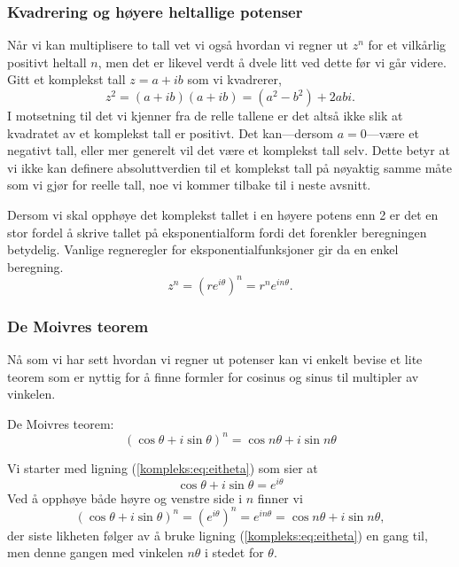 \documentclass[a4paper,norsk,12pt]{article}
\begin{document}
\subsubsection{Kvadrering og høyere heltallige potenser}
Når vi kan multiplisere to tall vet vi også hvordan vi regner ut $z^n$ for et vilkårlig positivt heltall $n$, men det er likevel verdt å dvele litt ved dette før vi går videre. Gitt et komplekst tall $z=a+ib$ som vi kvadrerer,
\begin{displaymath}
	z^2 = (a+ib)(a+ib) = (a^2-b^2) +2abi.
\end{displaymath}
I motsetning til det vi kjenner fra de relle tallene er det altså ikke slik at kvadratet av et komplekst tall er positivt. Det kan---dersom $a=0$---være et negativt tall, eller mer generelt vil det være et komplekst tall selv. Dette betyr at vi ikke kan definere absoluttverdien til et komplekst tall på nøyaktig samme måte som vi gjør for reelle tall, noe vi kommer tilbake til i neste avsnitt. 

Dersom vi skal opphøye det komplekst tallet i en høyere potens enn 2 er det en stor fordel å skrive tallet på eksponentialform fordi det forenkler beregningen betydelig. Vanlige regneregler for eksponentialfunksjoner gir da en enkel beregning.
\begin{displaymath}
	z^n = \left(re^{i\theta}\right)^n = r^n e^{in\theta}.
\end{displaymath}

\subsubsection{De Moivres teorem}
Nå som vi har sett hvordan vi regner ut potenser kan vi enkelt bevise et lite teorem som er nyttig for å finne formler for cosinus og sinus til multipler av vinkelen.
\begin{ttheorem}
De Moivres teorem: 
\begin{displaymath}
	\left(\cos\theta + i\sin\theta\right)^n = \cos n\theta + i\sin n\theta
\end{displaymath}
\end{ttheorem}
\begin{tproof}
Vi starter med ligning (\ref{kompleks:eq:eitheta}) som sier at
\begin{displaymath}
	\cos\theta + i\sin\theta = e^{i\theta}
\end{displaymath}
Ved å opphøye både høyre og venstre side i $n$ finner vi
\begin{displaymath}
	\left(\cos\theta+ i\sin\theta\right)^n = \left(e^{i\theta}\right)^n = e^{in\theta} = \cos n\theta + i\sin n\theta,
\end{displaymath}
der siste likheten følger av å bruke ligning (\ref{kompleks:eq:eitheta}) en gang til, men denne gangen med vinkelen $n\theta$ i stedet for $\theta$.
\end{tproof}
\end{document}
